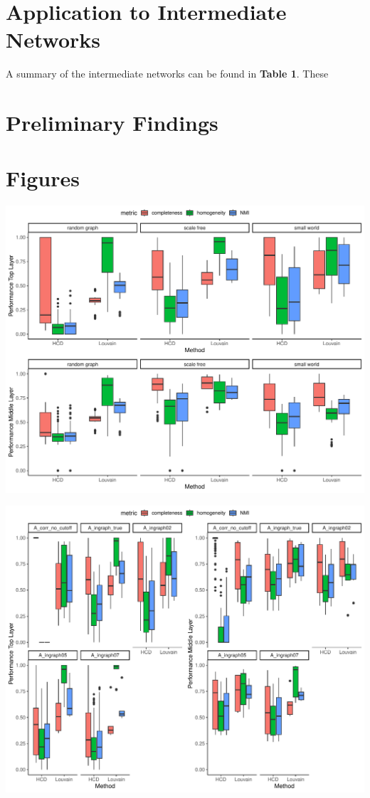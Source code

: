 \documentclass[
]{article}
\begin{document}
\section*{Application to Intermediate Networks}

A summary of the intermediate networks can be found in \textbf{Table 1}.
These

\section*{Preliminary Findings}

\newpage
\section*{Figures}

\includegraphics{Lab_report_3_13_2024_files/figure-latex/fig1-1.pdf}

\includegraphics{Lab_report_3_13_2024_files/figure-latex/unnamed-chunk-1-1.pdf}
\end{document}
